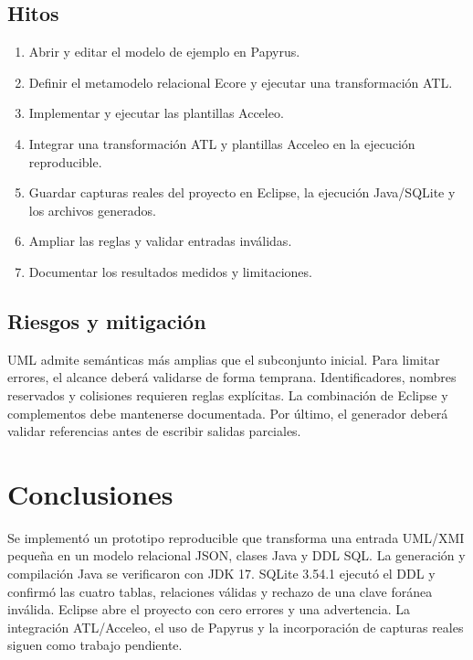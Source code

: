 \documentclass[12pt,a4paper,oneside]{report}
\begin{document}
\section{Hitos}
\begin{enumerate}
  \item Abrir y editar el modelo de ejemplo en Papyrus.
  \item Definir el metamodelo relacional Ecore y ejecutar una transformación ATL.
  \item Implementar y ejecutar las plantillas Acceleo.
  \item Integrar una transformación ATL y plantillas Acceleo en la ejecución reproducible.
  \item Guardar capturas reales del proyecto en Eclipse, la ejecución Java/SQLite y los archivos generados.
  \item Ampliar las reglas y validar entradas inválidas.
  \item Documentar los resultados medidos y limitaciones.
\end{enumerate}

\section{Riesgos y mitigación}
UML admite semánticas más amplias que el subconjunto inicial. Para limitar errores, el alcance deberá validarse de forma temprana. Identificadores, nombres reservados y colisiones requieren reglas explícitas. La combinación de Eclipse y complementos debe mantenerse documentada. Por último, el generador deberá validar referencias antes de escribir salidas parciales.

\chapter{Conclusiones}
Se implementó un prototipo reproducible que transforma una entrada UML/XMI pequeña en un modelo relacional JSON, clases Java y DDL SQL. La generación y compilación Java se verificaron con JDK 17. SQLite 3.54.1 ejecutó el DDL y confirmó las cuatro tablas, relaciones válidas y rechazo de una clave foránea inválida. Eclipse abre el proyecto con cero errores y una advertencia. La integración ATL/Acceleo, el uso de Papyrus y la incorporación de capturas reales siguen como trabajo pendiente.
\end{document}
